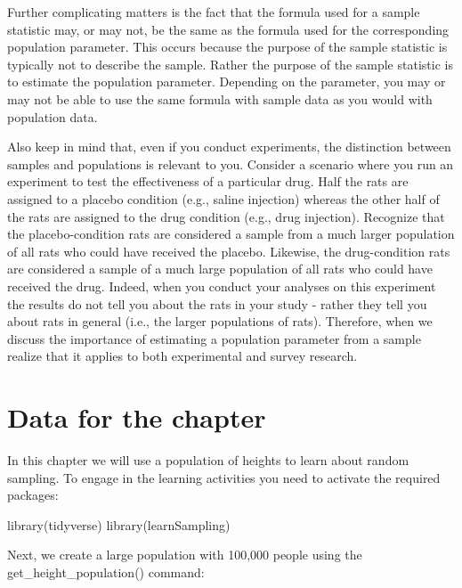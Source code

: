 \documentclass[
]{krantz}
\makeatletter
\newenvironment{Shaded}{\begin{snugshade}}{\end{snugshade}}
\newcommand{\FunctionTok}[1]{\textcolor[rgb]{0,0,0}{#1}}
\newcommand{\NormalTok}[1]{#1}
\newenvironment{kframe}{%
\medskip{}
\setlength{\fboxsep}{.8em}
 \def\at@end@of@kframe{}%
 \ifinner\ifhmode%
  \def\at@end@of@kframe{\end{minipage}}%
  \begin{minipage}{\columnwidth}%
 \fi\fi%
 \def\FrameCommand##1{\hskip\@totalleftmargin \hskip-\fboxsep
 \colorbox{shadecolor}{##1}\hskip-\fboxsep
     \hskip-\linewidth \hskip-\@totalleftmargin \hskip\columnwidth}%
 \MakeFramed {\advance\hsize-\width
   \@totalleftmargin\z@ \linewidth\hsize
   \@setminipage}}%
 {\par\unskip\endMakeFramed%
 \at@end@of@kframe}
\renewenvironment{Shaded}{\begin{kframe}}{\end{kframe}}
\makeatother
\begin{document}
Further complicating matters is the fact that the formula used for a sample statistic may, or may not, be the same as the formula used for the corresponding population parameter. This occurs because the purpose of the sample statistic is typically not to describe the sample. Rather the purpose of the sample statistic is to estimate the population parameter. Depending on the parameter, you may or may not be able to use the same formula with sample data as you would with population data.

Also keep in mind that, even if you conduct experiments, the distinction between samples and populations is relevant to you. Consider a scenario where you run an experiment to test the effectiveness of a particular drug. Half the rats are assigned to a placebo condition (e.g., saline injection) whereas the other half of the rats are assigned to the drug condition (e.g., drug injection). Recognize that the placebo-condition rats are considered a sample from a much larger population of all rats who could have received the placebo. Likewise, the drug-condition rats are considered a sample of a much large population of all rats who could have received the drug. Indeed, when you conduct your analyses on this experiment the results do not tell you about the rats in your study - rather they tell you about rats in general (i.e., the larger populations of rats). Therefore, when we discuss the importance of estimating a population parameter from a sample realize that it applies to both experimental and survey research.

\hypertarget{data-for-the-chapter}{%
\section{Data for the chapter}\label{data-for-the-chapter}}

In this chapter we will use a population of heights to learn about random sampling. To engage in the learning activities you need to activate the required packages:

\begin{Shaded}
\begin{Highlighting}[]
\FunctionTok{library}\NormalTok{(tidyverse)}
\FunctionTok{library}\NormalTok{(learnSampling)}
\end{Highlighting}
\end{Shaded}

Next, we create a large population with 100,000 people using the get\_height\_population() command:
\end{document}

